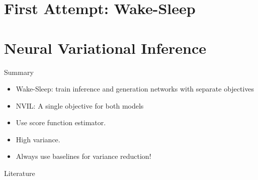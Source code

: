 \documentclass[14pt]{beamer}
\begin{document}
\begin{comment}  %
\begin{frame}{Recap: Variational Inference}
\begin{block}{Objective}
\begin{equation*}
\underset{q(z)}{\max}~\E{\log p(x,z)} + \Ent{q(z)}
\end{equation*}
\begin{itemize}
\item The ELBO is a lower bound on $ \log p(x) $
\item Mean field assumption: $ q(z) = \prod_{i=1}^{N}q(z_{i}) $
\end{itemize}
\end{block}
\end{frame}
\end{comment}

\section{First Attempt: Wake-Sleep}
\frame{\tableofcontents[currentsection]}




\section{Neural Variational Inference}
\frame{\tableofcontents[currentsection]}



\begin{frame}{Summary}
\begin{itemize}
\item Wake-Sleep: train inference and generation networks with separate objectives
\pause
\item NVIL: A single objective for both models
\pause
\item Use score function estimator.
\pause
\item High variance.
\pause
\item Always use baselines for variance reduction!
\end{itemize}
\end{frame}

\begin{frame}[allowframebreaks]{Literature}
\nocite{HintonEtAl:1995}
\nocite{MnihNVIL}
\nocite{greensmith2004variance}



\end{frame}
\end{document}
